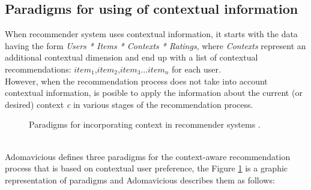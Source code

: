 \subsection{Paradigms for using of contextual information}

When recommender system uses contextual information, it starts
with the data having the form \textit{Users * Items * Contexts * Ratings}, 
where  \textit{Contexts} represent an additional contextual dimension 
and end up  with a list of contextual recommendations:  
$item_{1}$,$item_{2}$,$item_{3}$...$item_{n}$  for each user. \\
However, when  the recommendation process does not  take into 
account  contextual information, is posible to apply the information 
about the current (or desired) context \textit{c} in various stages 
of the recommendation process.
\begin{figure}
\captionsetup{font=footnotesize}
\centering
{}
\small
\caption{Paradigms for incorporating context in recommender 
systems \cite{adomavicius2011context}.}
\label{fig:paradigms}   
\end{figure}
\\ Adomavicious \cite{adomavicius2011context} defines three paradigms for
the context-aware recommendation process that is based on contextual
user preference, the Figure  \ref{fig:paradigms} is a graphic representation 
of paradigms and Adomavicious describes them as follows:
